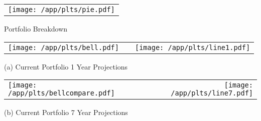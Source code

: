 \documentclass{article}
\begin{document}
\begin{adjustwidth}{-.3in}{0in}%
\vspace*{-1cm}

\begin{center}
  \begin{tabular}{c}
    \texttt{[image: /app/plts/pie.pdf]}
%
%  

  \end{tabular}
  \end{center}

  \begin{center}
        Portfolio Breakdown
  \end{center}

\vspace{.7cm}


\begin{center}
  \begin{tabular}{lcr}
  \texttt{[image: /app/plts/bell.pdf]}
    & \hspace{1cm }&\texttt{[image: /app/plts/line1.pdf]}
  \end{tabular}
  \end{center}

  \begin{center}
      (a) Current Portfolio 1 Year Projections
  \end{center}

  \vspace{.7cm}


\begin{center}
  \begin{tabular}{lcr}
  \texttt{[image: /app/plts/bellcompare.pdf]}
    & \hspace{1cm }&\texttt{[image: /app/plts/line7.pdf]}
  \end{tabular}
  \end{center}

  \begin{center}
      (b) Current Portfolio 7 Year Projections
  \end{center}

 \vspace{.6cm}

\end{adjustwidth}
\end{document}
